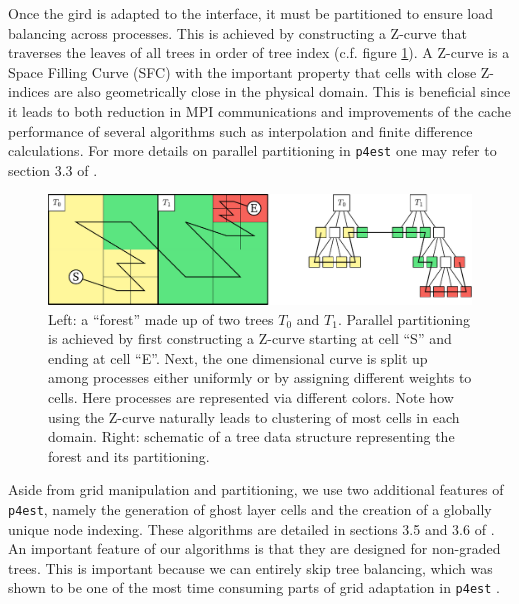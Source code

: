 Once the gird is adapted to the interface, it must be partitioned to ensure load balancing across processes. This is achieved by constructing a Z-curve that traverses the leaves of all trees in order of tree index (c.f. figure \ref{fig:p4est_zcurve}). A Z-curve is a Space Filling Curve (SFC) with the important property that cells with close Z-indices are also geometrically close in the physical domain. This is beneficial since it leads to both reduction in MPI communications and improvements of the cache performance of several algorithms such as interpolation and finite difference calculations. For more details on parallel partitioning in \texttt{p4est} one may refer to section 3.3 of \cite{Burstedde;Wilcox;Ghattas:11:p4est:-Scalable-Algo}.
\begin{figure}[hbtp]
\begin{center}
\includegraphics[width = \columnwidth]{figures/p4est_zcurve.pdf}
\caption{Left: a ``forest'' made up of two trees $T_0$ and $T_1$. Parallel partitioning is achieved by first constructing a Z-curve starting at cell ``S'' and ending at cell ``E''. Next, the one dimensional curve is split up among processes either uniformly or by assigning different weights to cells. Here processes are represented via different colors. Note how using the Z-curve naturally leads to clustering of most cells in each domain. Right: schematic of a tree data structure representing the forest and its partitioning.}
\label{fig:p4est_zcurve}
\end{center}
\end{figure}
Aside from grid manipulation and partitioning, we use two additional features of \texttt{p4est}, namely the generation of ghost layer cells and the creation of a globally unique node indexing. These algorithms are detailed in sections 3.5 and 3.6 of \cite{Burstedde;Wilcox;Ghattas:11:p4est:-Scalable-Algo}. An important feature of our algorithms is that they are designed for non-graded trees. This is important because we can entirely skip tree balancing, which was shown to be one of the most time consuming parts of grid adaptation in \texttt{p4est} \cite{Burstedde;Wilcox;Ghattas:11:p4est:-Scalable-Algo}.

